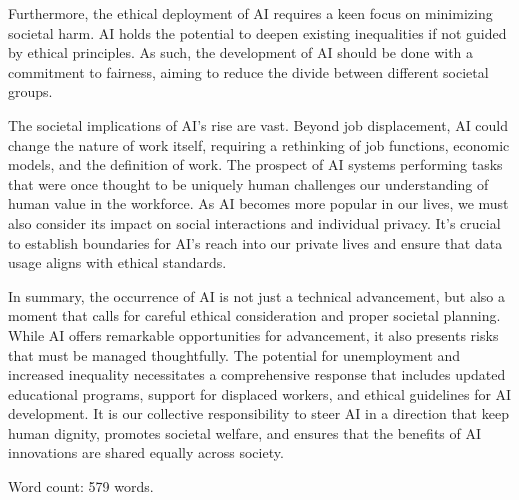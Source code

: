 \documentclass[12pt]{article}
\begin{document}
{Furthermore, the ethical deployment of AI requires a keen focus on minimizing societal harm. AI holds the potential to deepen existing inequalities if not guided by ethical principles. As such, the development of AI should be done with a commitment to fairness, aiming to reduce the divide between different societal groups.

The societal implications of AI's rise are vast. Beyond job displacement, AI could change the nature of work itself, requiring a rethinking of job functions, economic models, and the definition of work. The prospect of AI systems performing tasks that were once thought to be uniquely human challenges our understanding of human value in the workforce. As AI becomes more popular in our lives, we must also consider its impact on social interactions and individual privacy. It's crucial to establish boundaries for AI's reach into our private lives and ensure that data usage aligns with ethical standards.

In summary, the occurrence of AI is not just a technical advancement, but also a moment that calls for careful ethical consideration and proper societal planning. While AI offers remarkable opportunities for advancement, it also presents risks that must be managed thoughtfully. The potential for unemployment and increased inequality necessitates a comprehensive response that includes updated educational programs, support for displaced workers, and ethical guidelines for AI development. It is our collective responsibility to steer AI in a direction that keep human dignity, promotes societal welfare, and ensures that the benefits of AI innovations are shared equally across society.


Word count: 579 words. %

}

\printbibliography[title={References - Zongkai}, category=zongkai]
\end{document}
